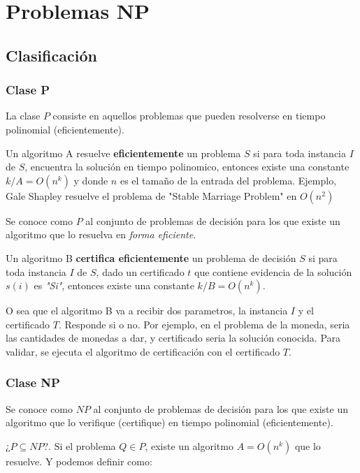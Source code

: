 \documentclass{article}
\begin{document}
\newpage
\section{Problemas NP}

\subsection{Clasificación}

\subsubsection{Clase P}

La clase \(P\) consiste en aquellos problemas que pueden resolverse en tiempo polinomial (eficientemente).

Un algoritmo A resuelve \textbf{eficientemente} un problema \(S\) si para toda instancia \(I\) de \(S\),
encuentra la solución en tiempo polinomico, entonces existe una constante \(k / A = O(n^k)\) 
y donde \(n\) es el tamaño de la entrada del problema. 
Ejemplo, Gale Shapley resuelve el problema de "Stable Marriage Problem" en \(O(n^2)\)

Se conoce como \(P\) al conjunto de problemas de decisión para los que existe un algoritmo que lo resuelva en
\textit{forma eficiente}.

Un algoritmo B \textbf{certifica eficientemente} un problema de decisión \(S\)  si para toda instancia \(I\) de \(S\),
dado un certificado \(t\) que contiene evidencia de la solución \(s(i)\) es \textit{"Si"}, 
entonces existe una constante \(k / B = O(n^k)\). 

O sea que el algoritmo B va a recibir dos parametros, la instancia \(I\) y el certificado \(T\).  
Responde si o no. Por ejemplo, en el problema de la moneda, seria las cantidades de monedas a dar, 
y certificado seria la solución conocida. Para validar, se ejecuta el algoritmo de certificación
con el certificado \(T\).


\subsubsection{Clase NP}

Se conoce como \(NP\) al conjunto de problemas de decisión para los que existe un algoritmo
que lo verifique (certifique) en tiempo polinomial (eficientemente).

¿\(P \subseteq NP\)?. Si el problema \(Q \in P\), existe un algoritmo \( A = O(n^k)\) que lo resuelve. Y podemos definir como:
\end{document}
